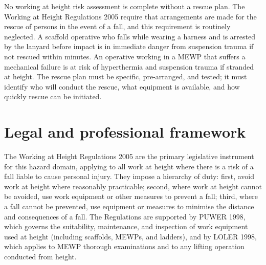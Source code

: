 No working at height risk assessment is complete without a rescue plan. The Working at Height Regulations 2005 require that arrangements are made for the rescue of persons in the event of a fall, and this requirement is routinely neglected. A scaffold operative who falls while wearing a harness and is arrested by the lanyard before impact is in immediate danger from suspension trauma if not rescued within minutes. An operative working in a MEWP that suffers a mechanical failure is at risk of hyperthermia and suspension trauma if stranded at height. The rescue plan must be specific, pre-arranged, and tested; it must identify who will conduct the rescue, what equipment is available, and how quickly rescue can be initiated.



\section{Legal and professional framework}

The Working at Height Regulations 2005 are the primary legislative instrument for this hazard domain, applying to all work at height where there is a risk of a fall liable to cause personal injury. They impose a hierarchy of duty: first, avoid work at height where reasonably practicable; second, where work at height cannot be avoided, use work equipment or other measures to prevent a fall; third, where a fall cannot be prevented, use equipment or measures to minimise the distance and consequences of a fall. The Regulations are supported by PUWER 1998, which governs the suitability, maintenance, and inspection of work equipment used at height (including scaffolds, MEWPs, and ladders), and by LOLER 1998, which applies to MEWP thorough examinations and to any lifting operation conducted from height.

